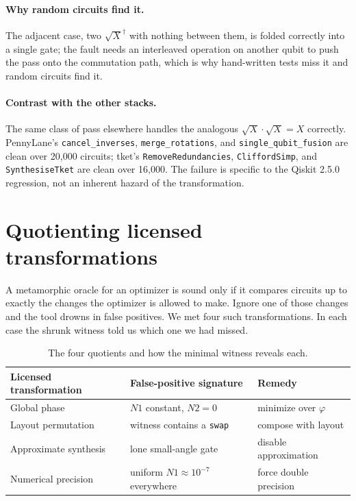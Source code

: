 \documentclass[11pt]{article}
\begin{document}
\paragraph{Why random circuits find it.}
The adjacent case, two $\sqrt{X}^\dagger$ with nothing between them, is
folded correctly into a single gate; the fault needs an interleaved
operation on another qubit to push the pass onto the commutation path,
which is why hand-written tests miss it and random circuits find it.

\paragraph{Contrast with the other stacks.}
The same class of pass elsewhere handles the analogous
$\sqrt{X}\cdot\sqrt{X} = X$ correctly. PennyLane's
\texttt{cancel\_inverses}, \texttt{merge\_rotations}, and
\texttt{single\_qubit\_fusion} are clean over 20{,}000 circuits; tket's
\texttt{RemoveRedundancies}, \texttt{CliffordSimp}, and
\texttt{SynthesiseTket} are clean over 16{,}000. The failure is specific
to the Qiskit 2.5.0 regression, not an inherent hazard of the
transformation.

\section{Quotienting licensed transformations}
\label{sec:quotients}

A metamorphic oracle for an optimizer is sound only if it compares
circuits up to exactly the changes the optimizer is allowed to make.
Ignore one of those changes and the tool drowns in false positives.
We met four such transformations. In each case the shrunk witness told
us which one we had missed.

\begin{table}[h]
\centering
\small
\begin{tabular}{lll}
\toprule
Licensed transformation & False-positive signature & Remedy \\
\midrule
Global phase & $N1$ constant, $N2 = 0$ & minimize over $\varphi$ \\
Layout permutation & witness contains a \texttt{swap} & compose with layout \\
Approximate synthesis & lone small-angle gate & disable approximation \\
Numerical precision & uniform $N1 \approx 10^{-7}$ everywhere & force double precision \\
\bottomrule
\end{tabular}
\caption{The four quotients and how the minimal witness reveals each.}
\label{tab:quotients}
\end{table}
\end{document}
